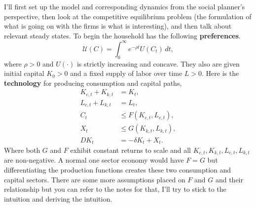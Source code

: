 \documentclass[11pt,english]{article}
\begin{document}
I'll first set up the model and corresponding dynamics from the social planner's perspective, then look at the competitive equilibrium problem (the formulation of what is going on with the firms is what is interesting), and then talk about relevant steady states. To begin the household has the following \textbf{preferences}.
$$\mathcal{U}(C) = \int_0^\infty e^{-\rho t}U(C_t)\,dt,$$ where $\rho > 0$ and $U(\cdot)$ is strictly increasing and concave. They also are given initial capital $K_0 > 0$ and a fixed supply of labor over time $L > 0$. Here is the \textbf{technology} for producing consumption and capital paths,
\begin{align*}
K_{c,t} + K_{k,t} &= K_t,\\
L_{c,t} + L_{k,t} &= L_t,\\
C_t &\leq F(K_{c,t}, L_{c,t}),\\
X_t &\leq G(K_{k,t}, L_{k,t}),\\
DK_t &=  -\delta K_t + X_t.
\end{align*}Where both $G$ and $F$ exhibit constant returns to scale and all $K_{c,t}, K_{k,t}, L_{c,t}, L_{k,t}$ are non-negative. A normal one sector economy would have $F = G$ but differentiating the production functions creates these two consumption and capital sectors. There are some more assumptions placed on $F$ and $G$ and their relationship but you can refer to the notes for that, I'll try to stick to the intuition and deriving the intuition.
\end{document}
